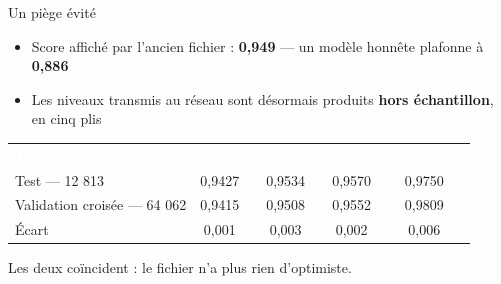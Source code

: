 \begin{frame}{Un piège évité}
\vspace{0.3em}

\vspace{0.5em}
\begin{itemize}\setlength{\itemsep}{0.4em}
  \item Score affiché par l'ancien fichier : \textbf{0,949} --- un modèle honnête
  plafonne à \textbf{0,886}
  \item Les niveaux transmis au réseau sont désormais produits \textbf{hors
  échantillon}, en cinq plis
\end{itemize}

\vspace{0.7em}
\centering\small
\renewcommand{\arraystretch}{1.25}
\begin{tabular}{@{}l c c c c@{}}
\rowcolor{BleuFonce}
\textcolor{white}{\textbf{Jeu}} & \textcolor{white}{\textbf{total}} &
\textcolor{white}{\textbf{chauffage}} & \textcolor{white}{\textbf{clim}} &
\textcolor{white}{\textbf{eau chaude}} \\
\rowcolor{GrisLeger} Test --- 12 813 & 0,9427 & 0,9534 & 0,9570 & 0,9750 \\
Validation croisée --- 64 062 & 0,9415 & 0,9508 & 0,9552 & 0,9809 \\
\rowcolor{VertOK} Écart & 0,001 & 0,003 & 0,002 & 0,006 \\
\end{tabular}

\vspace{0.5em}
{\small Les deux coïncident : le fichier n'a plus rien d'optimiste.}
\end{frame}

